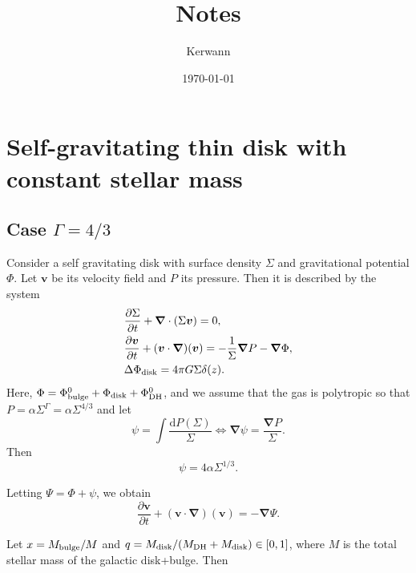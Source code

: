 \documentclass[11pt]{article}
\author{Kerwann}
\date{\today}
\title{Notes}
\newcommand{\bv}{\boldsymbol{v}}
\newcommand{\bnab}{\boldsymbol{\nabla}}
\newcommand{\rd}{\mathrm{d}}
\newcommand{\Phib}{\Phi_{\rm{bulge}}}
\newcommand{\Phid}{\Phi_{\rm{disk}}}
\newcommand{\Phidh}{\Phi_{\rm{DH}}}
\newcommand{\Mb}{M_{\rm{bulge}}}
\newcommand{\Md}{M_{\rm{disk}}}
\newcommand{\Mdh}{M_{\rm{DH}}}
\begin{document}
\maketitle

\tableofcontents


\section{Self-gravitating thin disk with constant stellar mass}
\label{sec:sg_disk_cst_mass}



\subsection{Case $\Gamma=4/3$}

Consider a self gravitating disk with surface density $\Sigma$ and gravitational potential $\Phi$. Let $\bv$ be its velocity field and $P$ its pressure. Then it is described by the system
\begin{align}
&\frac{\partial \Sigma}{\partial t} + \bnab \cdot (\Sigma \bv) = 0 ,\\
&\frac{\partial \bv}{\partial t} + (\bv \cdot \bnab)(\bv) = -\frac{1}{\Sigma} \bnab P - \bnab \Phi ,\\
& \Delta \Phid = 4\pi G \Sigma \delta (z).
\end{align}
Here, $\Phi =\Phib^0+  \Phid +  \Phidh^0$, and we 
assume that the gas is   polytropic so that $P=\alpha \Sigma^{\Gamma}=\alpha \Sigma^{4/3}$ and let
\begin{equation}
\psi = \int \frac{\rd P(\Sigma)}{\Sigma} \Leftrightarrow \bnab \psi = \frac{\bnab P}{\Sigma}.
\end{equation}
 Then
 \begin{equation}
\psi = 4\alpha \Sigma^{1/3}.
\end{equation}
 
 Letting $\Psi = \Phi + \psi$, we obtain
\begin{equation}
\frac{\partial \bv}{\partial t} + (\bv \cdot \bnab)(\bv) = - \bnab \Psi.
\end{equation}

Let $x=\Mb/M$ and $q=\Md/(\Mdh+\Md) \in [0,1]$, where $M$ is the total stellar mass of the galactic disk+bulge.   Then
\end{document}
